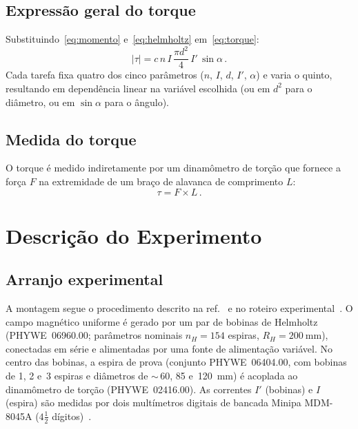 \documentclass[aps, twocolumn, superscriptaddress, floatfix, nofootinbib]{revtex4-2}
\begin{document}
\subsection{Expressão geral do torque}

Substituindo~\eqref{eq:momento} e~\eqref{eq:helmholtz} em~\eqref{eq:torque}:
\begin{equation}\label{eq:geral}
  |\tau| = c\,n\,I\,\frac{\pi d^2}{4}\,I'\,\sin\alpha\,.
\end{equation}
Cada tarefa fixa quatro dos cinco parâmetros ($n$, $I$, $d$, $I'$, $\alpha$) e
varia o quinto, resultando em dependência linear na variável escolhida (ou em
$d^2$ para o diâmetro, ou em $\sin\alpha$ para o ângulo).

\subsection{Medida do torque}

O torque é medido indiretamente por um dinamômetro de torção que fornece a
força $F$ na extremidade de um braço de alavanca de comprimento $L$:
\begin{equation}\label{eq:tau_FL}
  \tau = F \times L\,.
\end{equation}


\section{Descrição do Experimento}\label{sec:descricao}

\subsection{Arranjo experimental}

A montagem segue o procedimento descrito na ref.~\cite{PHYWE} e no roteiro
experimental~\cite{Roteiro}. O campo magnético uniforme é gerado por um par de
bobinas de Helmholtz (PHYWE~06960.00; parâmetros nominais $n_H=154$ espiras,
$R_H=\SI{200}{\milli\metre}$), conectadas em série e alimentadas por uma fonte
de alimentação variável. No centro das bobinas, a espira de prova (conjunto
PHYWE~06404.00, com bobinas de 1, 2 e~3 espiras e diâmetros de
$\sim$\,60, 85 e~\SI{120}{\milli\metre}) é acoplada ao dinamômetro de torção
(PHYWE~02416.00). As correntes $I'$ (bobinas) e $I$ (espira) são medidas por
dois multímetros digitais de bancada Minipa MDM-8045A ($4\frac{1}{2}$
dígitos)~\cite{MDM8045A}.
\end{document}
